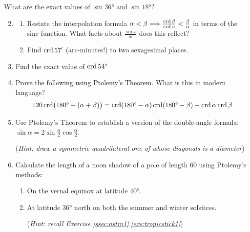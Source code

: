 \begin{exercises}{}{}
	\exstart What are the exact values of $\sin\ang{36}$ and $\sin\ang{18}$?
	
	\begin{enumerate}\setcounter{enumi}{1}
	  \item\begin{enumerate}
	    \item Restate the interpolation formula $\alpha<\beta\Longrightarrow \frac{\crd\beta}{\crd\alpha}<\frac\beta\alpha$ in terms of the sine function. What facts about $\frac{\sin x}x$ does this reflect?
	    \item Find $\crd 57'$ (arc-minutes!) to two sexagesimal places.
	  \end{enumerate} 
	  
	  \item Find the exact value of $\crd \ang{54}$
	  
	  \item%
	  Prove the following using Ptolemy's Theorem. What is this in modern language?
	  \[
	  	120\crd\bigl(\ang{180}-(\alpha+\beta)\bigr) =\crd(\ang{180}-\alpha)\crd(\ang{180}-\beta)-\crd\alpha\crd\beta
	  \]
	  
	  \item Use Ptolemy's Theorem to establish a version of the double-angle formula: $\sin \alpha=2\sin\frac\alpha 2\cos\frac\alpha 2$.\par
	  (\emph{Hint: draw a symmetric quadrilateral one of whose diagonals is a diameter})
	  
	  
	  \item%
	  Calculate the length of a noon shadow of a pole of length 60 using Ptolemy's methods:
	  \begin{enumerate}
	    \item On the vernal equinox at latitude $\ang{40}$.
	  	\item%
	  	At latitude \ang{36} north on both the summer and winter solstices.\par
	  (\emph{Hint: recall Exercise \ref*{ssec:astro1}.\ref{exs:tropicstick1}})
	  \end{enumerate}
	\end{enumerate}
\end{exercises}